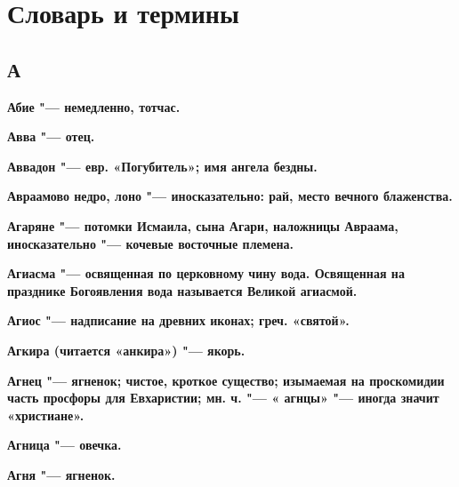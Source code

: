 
\chapter{Словарь и термины}
 
\begin{mymulticols}{2}\footnotesize

\section{А}


\bfseries Абие\normalfont{} "--- немедленно, тотчас. 




\bfseries Авва\normalfont{} "--- отец. 




\bfseries Аввадон\normalfont{} "--- евр. «Погубитель»; имя ангела бездны. 




\bfseries Авраамово недро, лоно\normalfont{} "--- иносказательно: рай, место вечного блаженства. 




\bfseries Агаряне\normalfont{} "--- потомки Исмаила, сына Агари, наложницы Авраама, иносказательно "--- кочевые восточные племена. 




\bfseries Агиасма\normalfont{} "--- освященная по церковному чину вода. Освященная на празднике Богоявления вода называется Великой агиасмой. 




\bfseries Агиос\normalfont{} "--- надписание на древних иконах; греч. «святой». 




\bfseries Агкира\normalfont{} (читается «анкира») "--- якорь. 




\bfseries Агнец\normalfont{} "--- ягненок; чистое, кроткое существо; изымаемая на проскомидии часть просфоры для Евхаристии; мн. ч. "--- « \bfseries агнцы\normalfont{}» "--- иногда значит «христиане». 




\bfseries Агница\normalfont{} "--- овечка. 




\bfseries Агня\normalfont{} "--- ягненок. 





\end{mymulticols}
